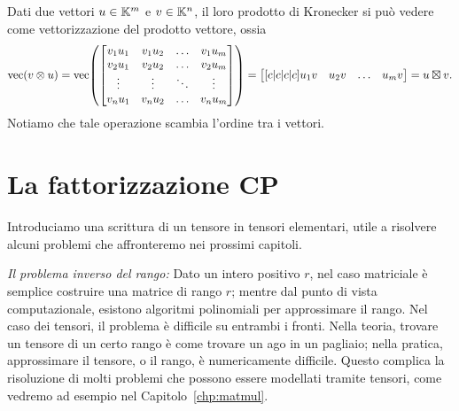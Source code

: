 \begin{remark}
	\label{rmk:krn_tensor}
	Dati due vettori $ u \in \mathbb{K}^m $ e $ v \in \mathbb{K}^n $, il loro prodotto di Kronecker si può vedere come
	vettorizzazione del prodotto vettore, ossia
	\begin{equation}
		\Vec(v \otimes u) =
		\Vec \left(
		\begin{bmatrix}
			v_1u_1 & v_1u_2 & \ldots & v_1u_m \\
			v_2u_1 & v_2u_2 & \ldots & v_2u_m \\
			\vdots & \vdots & \ddots & \vdots \\
			v_nu_1 & v_nu_2 & \ldots & v_nu_m
		\end{bmatrix}  \right) =
		\begin{bmatrix}[c|c|c|c] u_1v & u_2v & \ldots &  u_mv \end{bmatrix} = u \krn v.
	\end{equation}
	Notiamo che tale operazione scambia l'ordine tra i vettori.
\end{remark}




\section{La fattorizzazione CP}
\label{sec:cp_factorization}

Introduciamo una scrittura di un tensore in tensori elementari, utile a risolvere alcuni
problemi che affronteremo nei prossimi capitoli.

\emph{Il problema inverso del rango:} Dato un intero positivo $ r $, nel caso matriciale è semplice costruire una matrice di
rango $ r $; mentre dal punto di vista computazionale, esistono algoritmi polinomiali per
approssimare il rango. Nel caso dei tensori, il problema è difficile su entrambi i fronti. Nella
teoria, trovare un tensore di un certo rango è come trovare un ago in un pagliaio; nella pratica,
approssimare il tensore, o il rango, è numericamente difficile. Questo complica la risoluzione di molti problemi che possono essere modellati tramite tensori, come
vedremo ad esempio nel
Capitolo~\ref{chp:matmul}.

